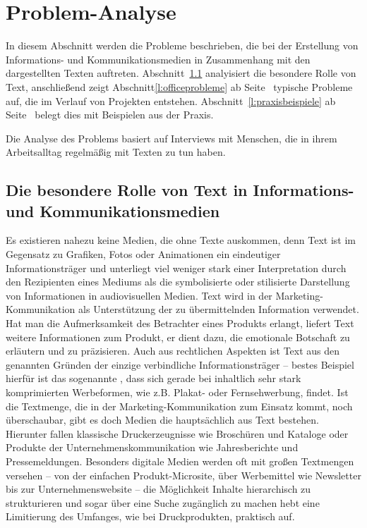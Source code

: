 \section{Problem-Analyse}\label{l:problemanalyse}

In diesem Abschnitt werden die Probleme beschrieben, die bei der Erstellung von Informations- und Kommunikationsmedien in Zusammenhang mit den dargestellten Texten auftreten. Abschnitt~\ref{l:besondererolle} analyisiert die besondere Rolle von Text, anschließend zeigt Abschnitt\ref{l:officeprobleme} ab Seite~\pageref{l:officeprobleme} typische Probleme auf, die im Verlauf von Projekten entstehen. Abschnitt~\ref{l:praxisbeispiele} ab Seite~\pageref{l:praxisbeispiele} belegt dies mit Beispielen aus der Praxis. 

Die Analyse des Problems basiert auf Interviews mit Menschen, die in ihrem Arbeitsalltag regelmäßig mit Texten zu tun haben.

\subsection{Die besondere Rolle von Text in Informations- und Kommunikationsmedien}\label{l:besondererolle}

Es existieren nahezu keine Medien, die ohne Texte auskommen, denn Text ist im Gegensatz zu Grafiken, Fotos oder Animationen ein eindeutiger Informationsträger und unterliegt viel weniger stark einer Interpretation durch den Rezipienten eines Mediums als die symbolisierte oder stilisierte Darstellung von Informationen in audiovisuellen Medien. Text wird in der Marketing-Kommunikation als Unterstützung der zu übermittelnden Information verwendet. Hat man die Aufmerksamkeit des Betrachter eines Produkts erlangt, liefert Text weitere Informationen zum Produkt, er dient dazu, die emotionale Botschaft zu erläutern und zu präzisieren. Auch aus rechtlichen Aspekten ist Text aus den genannten Gründen der einzige verbindliche Informationsträger -- bestes Beispiel hierfür ist das sogenannte , dass sich gerade bei inhaltlich sehr stark komprimierten Werbeformen, wie z.B. Plakat- oder Fernsehwerbung, findet. Ist die Textmenge, die in der Marketing-Kommunikation zum Einsatz kommt, noch überschaubar, gibt es doch Medien die hauptsächlich aus Text bestehen. Hierunter fallen klassische Druckerzeugnisse wie Broschüren und Kataloge oder Produkte der Unternehmenskommunikation wie Jahresberichte und Pressemeldungen. Besonders digitale Medien werden oft mit großen Textmengen versehen -- von der einfachen Produkt-Microsite, über Werbemittel wie Newsletter bis zur Unternehmenswebsite -- die Möglichkeit Inhalte hierarchisch zu strukturieren und sogar über eine Suche zugänglich zu machen hebt eine Limitierung des Umfanges, wie bei Druckprodukten, praktisch auf.

